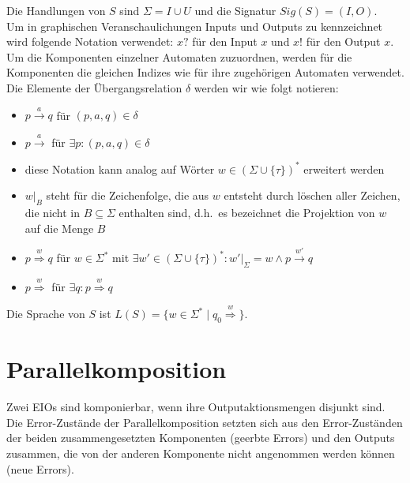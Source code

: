 Die Handlungen von $S$ sind $\Sigma = I\cup U$ und die Signatur
$Sig(S)=(I,O)$.\\
Um in graphischen Veranschaulichungen Inputs und Outputs zu kennzeichnet wird
folgende Notation verwendet: $x?$ für den Input $x$ und $x!$ für den Output
$x$.\\
Um die Komponenten einzelner Automaten zuzuordnen, werden für
die Komponenten die gleichen Indizes wie für ihre zugehörigen Automaten
verwendet.\\
Die Elemente der Übergangsrelation $\delta$ werden wir wie folgt notieren:
\begin{itemize}
  \item $p\overset{a}{\rightarrow} q$ für $(p,a,q)\in\delta$
  \item $p\overset{a}{\rightarrow}$ für $\exists p: (p,a,q)\in\delta$
  \item diese Notation kann analog auf Wörter $w\in(\Sigma\cup\{\tau\})^*$
    erweitert werden
  \item $w|_B$ steht für die Zeichenfolge, die aus $w$ entsteht durch löschen
    aller Zeichen, die nicht in $B\subseteq\Sigma$ enthalten sind, d.h.\ es
    bezeichnet die Projektion von $w$ auf die Menge $B$
  \item $p\overset{w}{\Rightarrow} q$ für $w\in\Sigma^*$ mit $\exists
    w'\in(\Sigma\cup\{\tau\})^*:w'|_{\Sigma}=w\wedge p\overset{w'}{\rightarrow}
    q$
  \item $p\overset{w}{\Rightarrow}$ für $\exists q:p\overset{w}{\Rightarrow} q$
\end{itemize}
Die Sprache von $S$ ist
$L(S)=\{w\in\Sigma^*\mid q_0\overset{w}{\Rightarrow}\}$.

\section{Parallelkomposition}
Zwei EIOs sind komponierbar, wenn ihre Outputaktionsmengen disjunkt sind. Die
Error-Zustände der Parallelkomposition setzten sich aus den Error-Zuständen der
beiden zusammengesetzten Komponenten (geerbte Errors) und den Outputs zusammen, die von der
anderen Komponente nicht angenommen werden können (neue Errors).

